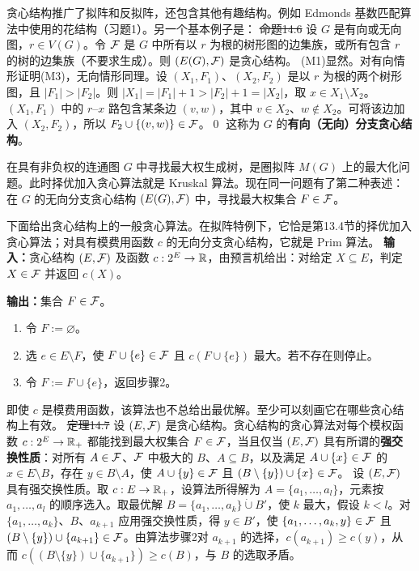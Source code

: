 贪心结构推广了拟阵和反拟阵，还包含其他有趣结构。例如 Edmonds 基数匹配算法中使用的花结构（习题1）。另一个基本例子是：
\st{命题14.6} 设 $G$ 是有向或无向图，$r\in V(G)$。令 $\mathcal F$ 是 $G$ 中所有以 $r$ 为根的树形图的边集族，或所有包含 $r$ 的树的边集族（不要求生成）。则 $(E(G),\mathcal F)$ 是贪心结构。
\pr (M1)显然。对有向情形证明(M3)，无向情形同理。设 $(X_1,F_1)$、$(X_2,F_2)$ 是以 $r$ 为根的两个树形图，且 $|F_1|>|F_2|$。则 $|X_1|=|F_1|+1>|F_2|+1=|X_2|$，取 $x\in X_1\setminus X_2$。$(X_1,F_1)$ 中的 $r$--$x$ 路包含某条边 $(v,w)$，其中 $v\in X_2$、$w\notin X_2$。可将该边加入 $(X_2,F_2)$，所以 $F_2\cup\{(v,w)\}\in\mathcal F$。\qed
这称为 $G$ 的\textbf{有向（无向）分支贪心结构}。

在具有非负权的连通图 $G$ 中寻找最大权生成树，是圈拟阵 $M(G)$ 上的最大化问题。此时择优加入贪心算法就是 Kruskal 算法。现在同一问题有了第二种表述：在 $G$ 的无向分支贪心结构 $(E(G),\mathcal F)$ 中，寻找最大权集合 $F\in\mathcal F$。

下面给出贪心结构上的一般贪心算法。在拟阵特例下，它恰是第13.4节的择优加入贪心算法；对具有模费用函数 $c$ 的无向分支贪心结构，它就是 Prim 算法。
\textbf{输入：}贪心结构 $(E,\mathcal F)$ 及函数 $c:2^E\to\mathbb R$，由预言机给出：对给定 $X\subseteq E$，判定 $X\in\mathcal F$ 并返回 $c(X)$。\par
\textbf{输出：}集合 $F\in\mathcal F$。
\begin{enumerate}[label=\arabic*.]
\item 令 $F:=\varnothing$。
\item 选 $e\in E\setminus F$，使 $F\cup\{e\}\in\mathcal F$ 且 $c(F\cup\{e\})$ 最大。若不存在则停止。
\item 令 $F:=F\cup\{e\}$，返回步骤2。
\end{enumerate}

即使 $c$ 是模费用函数，该算法也不总给出最优解。至少可以刻画它在哪些贪心结构上有效。
\st{定理14.7} 设 $(E,\mathcal F)$ 是贪心结构。贪心结构的贪心算法对每个模权函数 $c:2^E\to\mathbb R_+$ 都能找到最大权集合 $F\in\mathcal F$，当且仅当 $(E,\mathcal F)$ 具有所谓的\textbf{强交换性质}：对所有 $A\in\mathcal F$、$\mathcal F$ 中极大的 $B$、$A\subseteq B$，以及满足 $A\cup\{x\}\in\mathcal F$ 的 $x\in E\setminus B$，存在 $y\in B\setminus A$，使 $A\cup\{y\}\in\mathcal F$ 且 $(B\setminus\{y\})\cup\{x\}\in\mathcal F$。
\pr 设 $(E,\mathcal F)$ 具有强交换性质。取 $c:E\to\mathbb R_+$，设算法所得解为 $A=\{a_1,\ldots,a_l\}$，元素按 $a_1,\ldots,a_l$ 的顺序选入。取最优解 $B=\{a_1,\ldots,a_k\}\mathbin{\dot\cup}B'$，使 $k$ 最大，假设 $k<l$。对 $\{a_1,\ldots,a_k\}$、$B$、$a_{k+1}$ 应用强交换性质，得 $y\in B'$，使 $\{a_1,\ldots,a_k,y\}\in\mathcal F$ 且 $(B\setminus\{y\})\cup\{a_{k+1}\}\in\mathcal F$。由算法步骤2对 $a_{k+1}$ 的选择，$c(a_{k+1})\ge c(y)$，从而 $c((B\setminus\{y\})\cup\{a_{k+1}\})\ge c(B)$，与 $B$ 的选取矛盾。

